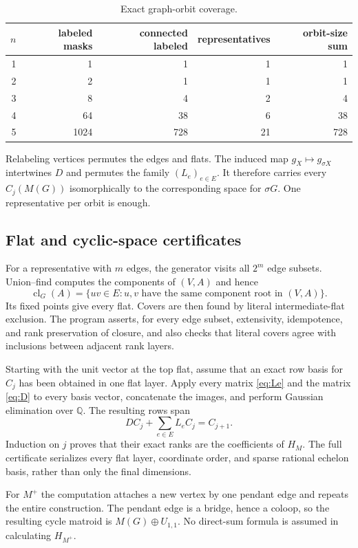 \documentclass[11pt]{article}
\theoremstyle{remark}
\newcommand{\Q}{\mathbb{Q}}
\newcommand{\cl}{\operatorname{cl}}
\begin{document}
\begin{table}[htbp]
\centering
\begin{tabular}{@{}rrrrr@{}}
\toprule
$n$ & labeled masks & connected labeled & representatives & orbit-size sum \\
\midrule
1 & 1    & 1   & 1  & 1   \\
2 & 2    & 1   & 1  & 1   \\
3 & 8    & 4   & 2  & 4   \\
4 & 64   & 38  & 6  & 38  \\
5 & 1024 & 728 & 21 & 728 \\
\bottomrule
\end{tabular}
\caption{Exact graph-orbit coverage.}
\label{tab:coverage}
\end{table}

Relabeling vertices permutes the edges and flats.  The induced map
$g_X\mapsto g_{\sigma X}$ intertwines $D$ and permutes the family
$(L_e)_{e\in E}$.  It therefore carries every $C_j(M(G))$ isomorphically to
the corresponding space for $\sigma G$.  One representative per orbit is
enough.

\subsection{Flat and cyclic-space certificates}

For a representative with $m$ edges, the generator visits all $2^m$ edge
subsets.  Union--find computes the components of $(V,A)$ and hence
\[
 \cl_G(A)=\{uv\in E:u,v\text{ have the same component root in }(V,A)\}.
\]
Its fixed points give every flat.  Covers are then found by literal
intermediate-flat exclusion.  The program asserts, for every edge subset,
extensivity, idempotence, and rank preservation of closure, and also checks
that literal covers agree with inclusions between adjacent rank layers.

Starting with the unit vector at the top flat, assume that an exact row basis
for $C_j$ has been obtained in one flat layer.  Apply every matrix
\eqref{eq:Le} and the matrix \eqref{eq:D} to every basis vector, concatenate
the images, and perform Gaussian elimination over $\Q$.  The resulting rows
span
\[
  DC_j+\sum_{e\in E}L_eC_j=C_{j+1}.
\]
Induction on $j$ proves that their exact ranks are the coefficients of
$H_M$.  The full certificate serializes every flat layer, coordinate order,
and sparse rational echelon basis, rather than only the final dimensions.

For $M^+$ the computation attaches a new vertex by one pendant edge and
repeats the entire construction.  The pendant edge is a bridge, hence a
coloop, so the resulting cycle matroid is $M(G)\oplus U_{1,1}$.  No direct-sum
formula is assumed in calculating $H_{M^+}$.
\end{document}
